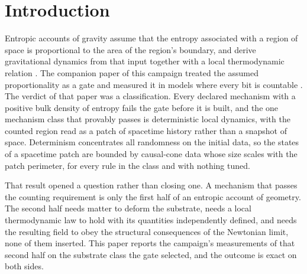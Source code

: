 \documentclass[aps,pre,reprint,nofootinbib]{revtex4-2}
\begin{document}
\begin{abstract}
through the constraint, carries an exactly static, graded, and
exactly superposing distinguishability field whose potential solves
the lattice Poisson equation.  Under a demotion ruling recorded
before the run, that result does not support entropy as the source of
geometry.  The constraint sources the geometry and distinguishability
registers it exactly, locating the missing ingredient of the failed
bar in a local conservation law rather than in entropy.  A last gate
asks whether such a constraint can emerge, and finds that under
generic local deformation the Gauss structure collapses rather than
deforms, so constraints are declared or absent, never emergent in
this class.  Nothing in this paper bears on physical gravity.
\end{abstract}

\maketitle

\section{Introduction}
\label{sec:intro}

Entropic accounts of gravity assume that the entropy associated with
a region of space is proportional to the area of the region's
boundary, and derive gravitational dynamics from that input together
with a local thermodynamic relation \cite{Jacobson1995, Bianconi2025,
DorauMuch2026}.  The companion paper of this campaign treated the
assumed proportionality as a gate and measured it in models where
every bit is countable \cite{AreaGatePaper}.  The verdict of that
paper was a classification.  Every declared mechanism with a positive
bulk density of entropy fails the gate before it is built, and the
one mechanism class that provably passes is deterministic local
dynamics, with the counted region read as a patch of spacetime
history rather than a snapshot of space.  Determinism concentrates
all randomness on the initial data, so the states of a spacetime
patch are bounded by causal-cone data whose size scales with the
patch perimeter, for every rule in the class and with nothing tuned.

That result opened a question rather than closing one.  A mechanism
that passes the counting requirement is only the first half of an
entropic account of geometry.  The second half needs matter to deform
the substrate, needs a local thermodynamic law to hold with its
quantities independently defined, and needs the resulting field to
obey the structural consequences of the Newtonian limit, none of them
inserted.  This paper reports the campaign's measurements of that
second half on the substrate class the gate selected, and the outcome
is exact on both sides.
\end{document}

